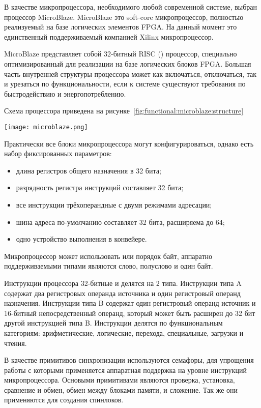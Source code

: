 В качестве микропроцессора, необходимого любой современной системе, выбран процессор MicroBlaze.
MicroBlaze это soft-core микропроцессор, полностью реализуемый на базе логических элементов FPGA.
На данный момент это единственный поддерживаемый компанией Xilinx микропроцессор.

MicroBlaze представляет собой 32-битный RISC () процессор,
специально оптимизированный для реализации на базе логических блоков FPGA. Большая
часть внутренней структуры процессора может как включаться, отключаться, так и урезаться
по функциональности, если к системе существуют требования по быстродействию и энергопотреблению.

Схема процессора приведена на рисунке~\ref{fig:functional:microblaze:structure}

\begin{center}
  \centering
  \texttt{[image: microblaze.png]}
  \label{fig:functional:microblaze:structure}
\end{center}

Практически все блоки микропроцессора могут конфигурироваться, однако есть набор фиксированных
параметров:
\begin{itemize}
  \item длина регистров общего назначения в 32 бита;
  \item разрядность регистра инструкций составляет 32 бита;
  \item все инструкции трёхоперандные с двумя режимами адресации;
  \item шина адреса по-умолчанию составляет 32 бита, расширяема до 64;
  \item одно устройство выполнения в конвейере.
\end{itemize}

Микропроцессор может использовать  или  порядок байт,
аппаратно поддерживаемыми типами являются слово, полуслово и один байт.

Инструкции процессора 32-битные и делятся на 2 типа. Инструкции типа A содержат
два регистровых операнда источника и один регистровый операнд назначения. Инструкции
типа B содержат один регистровый операнд источник и 16-битный непосредственный операнд,
который может быть расширен до 32 бит другой инструкцией типа B. Инструкции делятся по
функциональным категориям: арифметические, логические, перехода, специальные, загрузки и чтения.

В качестве примитивов синхронизации используются семафоры, для упрощения работы с которыми
применяется аппаратная поддержка на уровне инструкций микропроцессора. Основыми примитивами
являются проверка, установка, сравнение и обмен, обмен между блоками памяти, и сложение.
Так же они применяются для создания спинлоков.

